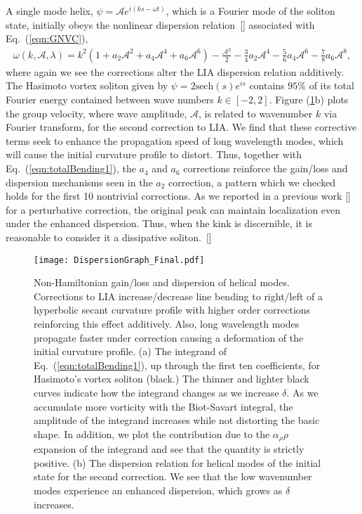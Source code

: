 \documentclass[aps,graphicx,reprint,onecolumn,12pt,tightenlines,longbibliography]{revtex4-1}
\newcommand{\sas}[2]{{#2}}
\begin{document}
A single mode helix, $\psi = \mathcal{A} e^{i(k s- \omega t)}$, which is a Fourier mode of the soliton state, initially obeys the nonlinear dispersion relation~[] associated with Eq.~(\ref{eqn:GNVC}),
 \begin{align}\label{eqn:Dispersion}
  \omega(k,\mathcal{A},\lambda) = k^{2}(1+ a_{2} \mathcal{A}^{2}+a_{4}\mathcal{A}^{4}+a_{6}\mathcal{A}^{6}) - \frac{\mathcal{A}^{2}}{2} - \frac{3}{4} a_{2} \mathcal{A}^{4} -\frac{5}{6}a_{4}\mathcal{A}^{6}  - \frac{7}{8} a_{6}\mathcal{A}^{8},
 \end{align}
where again we see the corrections alter the LIA dispersion relation additively. The Hasimoto vortex soliton given by $\psi = 2 \mbox{sech}(s) e^{is}$ contains  $95\%$ of its total Fourier \sas{mass}{energy} contained between wave numbers $k\in[-2,2]$.  Figure (\ref{fig:dispersion}b) plots the group velocity, where wave amplitude, $\mathcal{A}$, is related to wavenumber $k$ via Fourier transform, for the second correction to LIA. We find that these corrective terms seek to enhance the propagation speed of long wavelength modes, which will cause the initial curvature profile to distort. Thus, together with Eq.~(\ref{eqn:totalBending1}), the $a_{4}$ and $a_{6}$ corrections reinforce the gain/loss and dispersion mechanisms seen in the $a_{2}$ correction, a pattern which \sas{}{we checked} holds for the first 10 nontrivial corrections. As we reported in a previous work [] for a perturbative correction, the original peak can maintain localization even under the enhanced dispersion. Thus, when the kink is discernible, it is reasonable to consider it  a dissipative soliton.~[]
%
\begin{figure}[h]
\texttt{[image: DispersionGraph\_Final.pdf]}
\caption{Non-Hamiltonian gain/loss and dispersion of helical modes. Corrections to LIA increase/decrease line bending to right/left of a hyperbolic secant curvature profile with higher order corrections reinforcing this effect additively. Also, long wavelength modes propagate faster under correction causing a deformation of the initial curvature profile.  (a)  The integrand of Eq.~(\ref{eqn:totalBending1}), up through the first ten coefficients, for Hasimoto's vortex soliton (black.) The thinner and lighter black curves indicate how the integrand changes as we increase $\delta$. As we accumulate more vorticity with the Biot-Savart integral, the amplitude of the integrand increases while not distorting the basic shape. In addition, we plot the contribution due to the $\alpha_{\rho}\rho$ expansion of the integrand and see that the quantity is strictly positive. (b) The dispersion relation for helical modes of the initial state for the second correction. We see that the low wavenumber modes experience an enhanced dispersion, which grows as $\delta$ increases.}
\label{fig:dispersion}
\end{figure}
%
\end{document}
